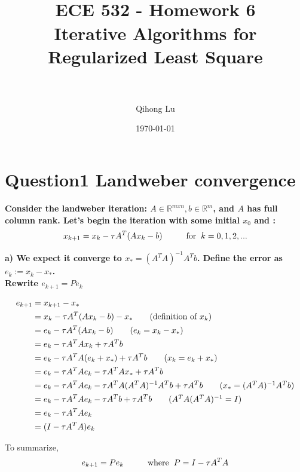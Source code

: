 \documentclass[paper=a4, fontsize=11pt]{scrartcl} %
\title{	
\normalfont \normalsize 
\horrule{0.5pt} \\[0.4cm] %
\huge ECE 532 - Homework 6 \\ Iterative Algorithms for Regularized Least Square\\ %
\horrule{2pt} \\[0.5cm] %
}
\author{Qihong Lu} %
\date{\normalsize\today} %
\numberwithin{equation}{section} %
\numberwithin{figure}{section} %
\numberwithin{table}{section} %
\begin{document}
\maketitle %


\section*{Question1 Landweber convergence}
\textbf{Consider the landweber iteration: $ A \in \mathbb{R}^{mxn}, b \in \mathbb{R}^m$, and $A$ has full column rank. Let's begin the iteration with some initial $x_0$ and : }\\
$$x_{k+1} = x_k - \tau A^T (A x_k - b) \hspace{1cm} \text{for} \hspace{.2cm} k = 0, 1, 2, ...$$

\textbf{a) We expect it converge to $x_* = (A^T A)^{-1} A^T b$. Define the error as $e_k := x_k - x_*$. \\Rewrite $e_{k+1} = P e_k$ }


\begin{align*} 
e_{k+1} &= x_{k+1} - x_*	\\
&= x_k - \tau A^T (A x_k - b) - x_*	 \tag{definition of $x_k$}\\
&= e_k - \tau A^T (A x_k - b)	\tag{$e_k = x_k - x_*$}\\
&= e_k - \tau A^T A x_k + \tau A^T b		\\
&= e_k - \tau A^T A (e_k + x_*) + \tau A^T b		\tag{$x_k = e_k + x_*$}\\
&= e_k - \tau A^T A e_k - \tau A^T A x_* + \tau A^T b		\\
&= e_k - \tau A^T A e_k - \tau A^T A (A^T A)^{-1}A^T b + \tau A^T b	\tag{$x_* = (A^T A)^{-1}A^T b $}\\
&= e_k - \tau A^T A e_k - \tau A^T b + \tau A^T b		\tag{$A^T A (A^T A)^{-1} = I$}\\
&= e_k - \tau A^T A e_k	\\
&= (I - \tau A^T A) e_k	\\
\end{align*}

To summarize, 
$$e_{k+1}= P e_k \hspace{1cm} \text{where} \hspace{.2cm} P = I - \tau A^T A$$
\end{document}
